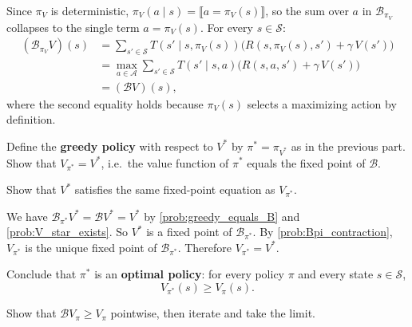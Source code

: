 \documentclass[11pt]{article}
\newcommand{\cS}{\mathcal{S}}
\newcommand{\cA}{\mathcal{A}}
\begin{document}
\begin{solution}
Since $\pi_V$ is deterministic, $\pi_V(a \mid s) = \llbracket a = \pi_V(s) \rrbracket$, so the sum over $a$ in $\mathcal{B}_{\pi_V}$ collapses to the single term $a = \pi_V(s)$. For every $s \in \cS$:
\begin{align*}
(\mathcal{B}_{\pi_V} V)(s) &= \sum_{s' \in \cS} T(s' \mid s, \pi_V(s))\bigl(R(s,\pi_V(s),s') + \gamma\, V(s')\bigr) \\
&= \max_{a \in \cA} \sum_{s' \in \cS} T(s' \mid s, a)\bigl(R(s,a,s') + \gamma\, V(s')\bigr) \\
&= (\mathcal{B} V)(s),
\end{align*}
where the second equality holds because $\pi_V(s)$ selects a maximizing action by definition.
\end{solution}

\begin{exercise}
\label{prob:V_pi_star} Define the \textbf{greedy policy} with respect to $V^*$ by $\pi^* = \pi_{V^*}$ as in the previous part.
Show that $V_{\pi^*} = V^*$, i.e.\ the value function of $\pi^*$ equals the fixed point of $\mathcal{B}$.

\begin{hint}
Show that $V^*$ satisfies the same fixed-point equation as $V_{\pi^*}$.
\end{hint}
\end{exercise}

\begin{solution}
We have $\mathcal{B}_{\pi^*} V^* = \mathcal{B} V^* = V^*$ by \cref{prob:greedy_equals_B} and \cref{prob:V_star_exists}.
So $V^*$ is a fixed point of $\mathcal{B}_{\pi^*}$. By \cref{prob:Bpi_contraction}, $V_{\pi^*}$ is the unique fixed point of $\mathcal{B}_{\pi^*}$. Therefore $V_{\pi^*} = V^*$.
\end{solution}

\begin{exercise}
\label{prob:optimality} Conclude that $\pi^*$ is an \textbf{optimal policy}: for every policy $\pi$ and every state $s \in \cS$,
$$
V_{\pi^*}(s) \ge V_\pi(s).
$$
\begin{hint}
Show that $\mathcal{B} V_\pi \ge V_\pi$ pointwise, then iterate and take the limit.
\end{hint}
\end{exercise}
\end{document}
